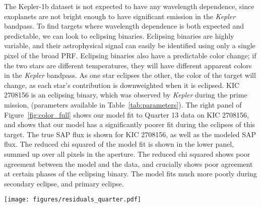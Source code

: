 \documentclass[iop]{emulateapj}
\newcommand{\kepler}{\emph{Kepler}\xspace}
\newcommand{\target}{KIC 2708156\xspace}
\begin{document}
The Kepler-1b dataset is not expected to have any wavelength dependence, since exoplanets are not bright enough to have significant emission in the \kepler bandpass. To find targets where wavelength dependence is both expected and predictable, we can look to eclipsing binaries. Eclipsing binaries are highly variable, and their astrophysical signal can easily be identified using only a single pixel of the broad PRF. Eclipsing binaries also have a predictable color change; if the two stars are different temperatures, they will have different apparent colors in the \kepler bandpass. As one star eclipses the other, the color of the target will change, as each star's contribution is downweighted when it is eclipsed. \target is an eclipsing binary, which was observed by \kepler during the prime mission, (parameters available in Table~\ref{tab:parameters}). The right panel of Figure~\ref{fig:color_full} shows our model fit to Quarter 13 data on \target, and shows that our model has a significantly poorer fit during the eclipses of this target. The true SAP flux is shown for \target, as well as the modeled SAP flux. The reduced chi squared of the model fit is shown in the lower panel, summed up over all pixels in the aperture. The reduced chi squared shows poor agreement between the model and the data, and crucially shows poor agreement at certain phases of the eclipsing binary. The model fits much more poorly during secondary eclipse, and primary eclipse.


\begin{figure*}
    \centering
    \texttt{[image: figures/residuals\_quarter.pdf]}
    \caption{Example of residuals during secondary eclipse for every \kepler quarter of \target. Because of the observing strategy of the \kepler mission, the target is on a different channel (with a different PRF) each quarter of the year, but returns to the same channel every 4th quarter. As shown here, the residual PRF shape is different on each channel, as expected, but is almost identical during quarters that land on the same channel. Note: the color scaling has been fixed for clarity to show the same level of variability across all channels. The color map has been chosen to reflect the true color change; i.e. blue pixels indicate that the secondary eclipse depth residual became positive, indicating a bluer pixel light curve, red pixels indicate that the secondary eclipse depth residual became negative, indicating a redder pixel light curve. The wavelength calibration of these pixels in terms of wavelength is discussed in Section \ref{sec:calibrate}.}
    \label{fig:quarter_demo}
\end{figure*}
\end{document}
